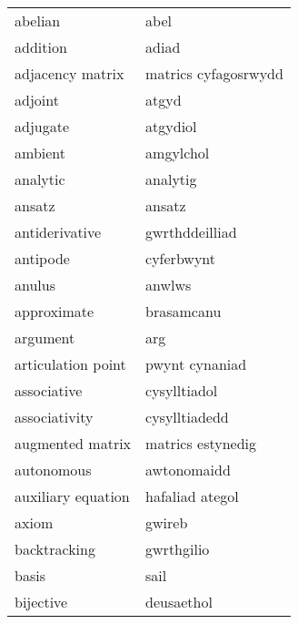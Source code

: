 \begin{supertabular}{p{0.22\textwidth}p{0.22\textwidth}}
                          abelian &                             abel \\
                         addition &                            adiad \\
                 adjacency matrix &             matrics cyfagosrwydd \\
                          adjoint &                            atgyd \\
                         adjugate &                         atgydiol \\
                          ambient &                        amgylchol \\
                         analytic &                         analytig \\
                           ansatz &                           ansatz \\
                   antiderivative &                   gwrthddeilliad \\
                         antipode &                       cyferbwynt \\
                           anulus &                           anwlws \\
                      approximate &                       brasamcanu \\
                         argument &                              arg \\
               articulation point &                   pwynt cynaniad \\
                      associative &                     cysylltiadol \\
                    associativity &                    cysylltiadedd \\
                 augmented matrix &                matrics estynedig \\
                       autonomous &                      awtonomaidd \\
               auxiliary equation &                  hafaliad ategol \\
                            axiom &                           gwireb \\
                     backtracking &                       gwrthgilio \\
                            basis &                             sail \\
                        bijective &                       deusaethol \\

\end{supertabular}
